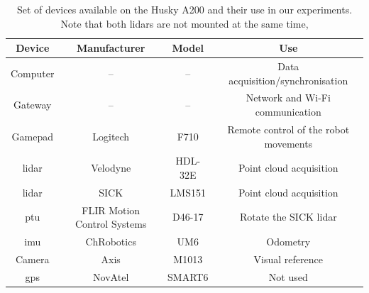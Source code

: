\begin{table}[h]
    \centering
    \begin{tabular}{|c|c|c|c|}
        \hline
        \textbf{Device} & \textbf{Manufacturer}       & \textbf{Model}  & \textbf{Use}                          \\ \hline
        Computer        & --                          & --              & Data acquisition/synchronisation      \\ \hline
        Gateway         & --                          & --              & Network and Wi-Fi communication       \\ \hline
        Gamepad         & Logitech                    & F710            & Remote control of the robot movements \\ \hline
        \gls{lidar}     & Velodyne                    & HDL-32E         & Point cloud acquisition               \\ \hline
        \gls{lidar}     & SICK                        & LMS151          & Point cloud acquisition               \\ \hline
        \gls{ptu}       & FLIR Motion Control Systems & D46-17          & Rotate the SICK \gls{lidar}           \\ \hline
        \gls{imu}       & ChRobotics                  & UM6             & Odometry                              \\ \hline
        Camera          & Axis                        & M1013           & Visual reference                      \\ \hline
        \gls{gps}       & NovAtel                     & SMART6          & Not used                              \\ \hline
    \end{tabular}
    \caption{\label{tab:husky_devices} Set of devices available on the Husky A200 and their use in our experiments. Note that both \gls{lidar}s are not mounted at the same time,}
    \label{tab:husky_sensors}
\end{table}

